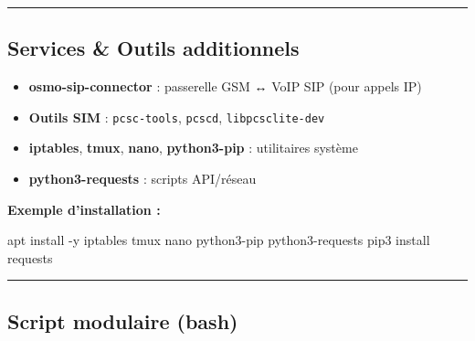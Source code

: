 \documentclass[
]{article}
\newenvironment{Shaded}{\begin{snugshade}}{\end{snugshade}}
\newcommand{\AttributeTok}[1]{\textcolor[rgb]{0.13,0.29,0.53}{#1}}
\newcommand{\ExtensionTok}[1]{#1}
\newcommand{\NormalTok}[1]{#1}
\providecommand{\tightlist}{%
  \setlength{\itemsep}{0pt}\setlength{\parskip}{0pt}}
\begin{document}
\begin{center}\rule{0.5\linewidth}{0.5pt}\end{center}

\subsection{Services \& Outils
additionnels}\label{services-outils-additionnels}

\begin{itemize}
\tightlist
\item
  \textbf{osmo-sip-connector} : passerelle GSM ↔ VoIP SIP (pour appels
  IP)
\item
  \textbf{Outils SIM} : \texttt{pcsc-tools}, \texttt{pcscd},
  \texttt{libpcsclite-dev}
\item
  \textbf{iptables}, \textbf{tmux}, \textbf{nano}, \textbf{python3-pip}
  : utilitaires système
\item
  \textbf{python3-requests} : scripts API/réseau
\end{itemize}

\textbf{Exemple d'installation :}

\begin{Shaded}
\begin{Highlighting}[]
\ExtensionTok{apt}\NormalTok{ install }\AttributeTok{{-}y}\NormalTok{ iptables tmux nano python3{-}pip python3{-}requests}
\ExtensionTok{pip3}\NormalTok{ install requests}
\end{Highlighting}
\end{Shaded}

\begin{center}\rule{0.5\linewidth}{0.5pt}\end{center}

\subsection{Script modulaire (bash)}\label{script-modulaire-bash}
\end{document}
